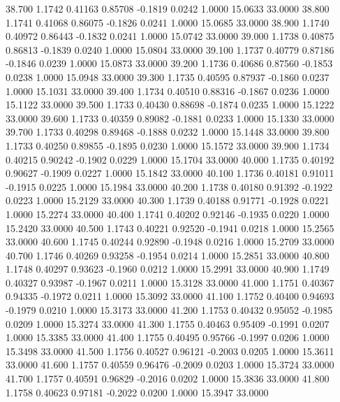   38.700   1.1742   0.41163   0.85708  -0.1819   0.0242   1.0000  15.0633  33.0000
  38.800   1.1741   0.41068   0.86075  -0.1826   0.0241   1.0000  15.0685  33.0000
  38.900   1.1740   0.40972   0.86443  -0.1832   0.0241   1.0000  15.0742  33.0000
  39.000   1.1738   0.40875   0.86813  -0.1839   0.0240   1.0000  15.0804  33.0000
  39.100   1.1737   0.40779   0.87186  -0.1846   0.0239   1.0000  15.0873  33.0000
  39.200   1.1736   0.40686   0.87560  -0.1853   0.0238   1.0000  15.0948  33.0000
  39.300   1.1735   0.40595   0.87937  -0.1860   0.0237   1.0000  15.1031  33.0000
  39.400   1.1734   0.40510   0.88316  -0.1867   0.0236   1.0000  15.1122  33.0000
  39.500   1.1733   0.40430   0.88698  -0.1874   0.0235   1.0000  15.1222  33.0000
  39.600   1.1733   0.40359   0.89082  -0.1881   0.0233   1.0000  15.1330  33.0000
  39.700   1.1733   0.40298   0.89468  -0.1888   0.0232   1.0000  15.1448  33.0000
  39.800   1.1733   0.40250   0.89855  -0.1895   0.0230   1.0000  15.1572  33.0000
  39.900   1.1734   0.40215   0.90242  -0.1902   0.0229   1.0000  15.1704  33.0000
  40.000   1.1735   0.40192   0.90627  -0.1909   0.0227   1.0000  15.1842  33.0000
  40.100   1.1736   0.40181   0.91011  -0.1915   0.0225   1.0000  15.1984  33.0000
  40.200   1.1738   0.40180   0.91392  -0.1922   0.0223   1.0000  15.2129  33.0000
  40.300   1.1739   0.40188   0.91771  -0.1928   0.0221   1.0000  15.2274  33.0000
  40.400   1.1741   0.40202   0.92146  -0.1935   0.0220   1.0000  15.2420  33.0000
  40.500   1.1743   0.40221   0.92520  -0.1941   0.0218   1.0000  15.2565  33.0000
  40.600   1.1745   0.40244   0.92890  -0.1948   0.0216   1.0000  15.2709  33.0000
  40.700   1.1746   0.40269   0.93258  -0.1954   0.0214   1.0000  15.2851  33.0000
  40.800   1.1748   0.40297   0.93623  -0.1960   0.0212   1.0000  15.2991  33.0000
  40.900   1.1749   0.40327   0.93987  -0.1967   0.0211   1.0000  15.3128  33.0000
  41.000   1.1751   0.40367   0.94335  -0.1972   0.0211   1.0000  15.3092  33.0000
  41.100   1.1752   0.40400   0.94693  -0.1979   0.0210   1.0000  15.3173  33.0000
  41.200   1.1753   0.40432   0.95052  -0.1985   0.0209   1.0000  15.3274  33.0000
  41.300   1.1755   0.40463   0.95409  -0.1991   0.0207   1.0000  15.3385  33.0000
  41.400   1.1755   0.40495   0.95766  -0.1997   0.0206   1.0000  15.3498  33.0000
  41.500   1.1756   0.40527   0.96121  -0.2003   0.0205   1.0000  15.3611  33.0000
  41.600   1.1757   0.40559   0.96476  -0.2009   0.0203   1.0000  15.3724  33.0000
  41.700   1.1757   0.40591   0.96829  -0.2016   0.0202   1.0000  15.3836  33.0000
  41.800   1.1758   0.40623   0.97181  -0.2022   0.0200   1.0000  15.3947  33.0000
